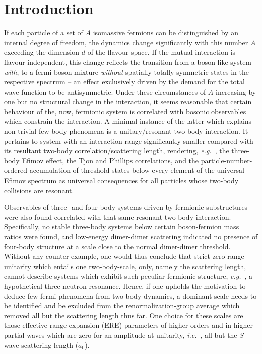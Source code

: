 \documentclass[preprint,12pt]{elsarticle}
\newcommand{\eg}{\textit{e.g.}~}
\newcommand{\ie}{\textit{i.e.}~}
\begin{document}
\section{Introduction}

If each particle of a set of $A$ isomassive fermions can be distinguished by an internal degree of
freedom, the dynamics change significantly with this number $A$ exceeding the dimension $d$ of
the flavour space. If the mutual interaction is flavour independent, this change reflects
the transition from a boson-like system \emph{with}, to a fermi-boson mixture \emph{without} spatially
totally symmetric states in the respective spectrum -- an effect exclusively driven by
the demand for the total wave function to be antisymmetric.
Under these circumstances of $A$ increasing by one but no structural change in the interaction,
it seems reasonable that certain behaviour of the, now, fermionic
system is correlated with bosonic observables which constrain the interaction.
A minimal instance of the latter which explains non-trivial few-body phenomena is a
unitary/resonant two-body interaction. It pertains to system with an interaction range
significantly smaller compared with its resultant two-body correlation/scattering length,
rendering, \eg, the three-body Efimov effect, the Tjon and Phillips correlations, and the
particle-number-ordered accumulation of threshold states below every element of the universal
Efimov spectrum as universal consequences for all particles whose two-body collisions are resonant.

Observables of three- and four-body systems driven by fermionic substructures were also found
correlated with that same resonant two-body interaction. Specifically, no stable
three-body systems below certain boson-fermion mass ratios were found, and low-energy
dimer-dimer scattering indicated no presence of four-body structure 
at a scale close to the normal dimer-dimer threshold.
Without any counter example, one would thus conclude that strict zero-range unitarity which
entails one two-body-scale, only, namely the scattering length, cannot describe 
systems which exhibit such peculiar fermionic structure, \eg, a hypothetical three-neutron resonance.
Hence, if one upholds the motivation to deduce few-fermi phenomena from two-body dynamics, a dominant
scale needs to be identified and be excluded from the renormalization-group average which removed
all but the scattering length thus far. One choice for these scales are those effective-range-expansion (ERE)
parameters of higher orders and in higher partial waves which are zero for an amplitude at unitarity, \ie,
all but the $S$-wave scattering length ($a_0$).
\end{document}
